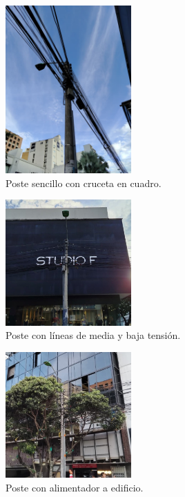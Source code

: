 \begin{figure}[H]
    \centering
    \includegraphics[width=0.43\textwidth, height=0.43\textwidth]{fig_/4}
    \caption{Poste sencillo con cruceta en cuadro.}
    \label{fig:poste_sencillo_cuadro}
\end{figure}

\begin{figure}[H]
    \centering
    \includegraphics[width=0.43\textwidth, height=0.43\textwidth]{fig_/5}
    \caption{Poste con líneas de media y baja tensión.}
    \label{fig:poste_mt_bt}
\end{figure}

\begin{figure}[H]
    \centering
    \includegraphics[width=0.43\textwidth, height=0.43\textwidth]{fig_/6}
    \caption{Poste con alimentador a edificio.}
    \label{fig:poste_acometida_edificio}
\end{figure}


